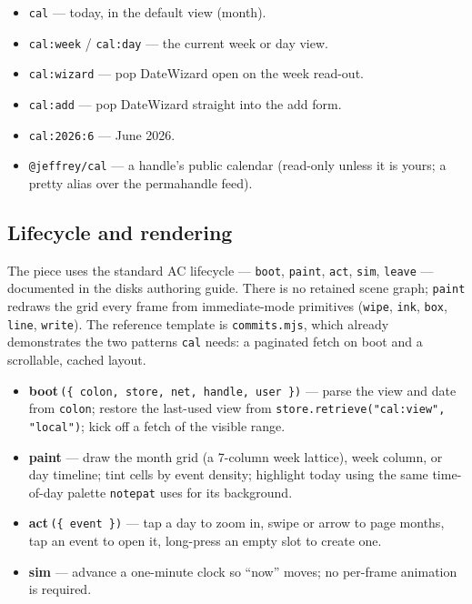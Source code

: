 \documentclass[10pt,letterpaper,twocolumn]{article}
\begin{document}
\begin{itemize}
  \item \texttt{cal} --- today, in the default view (month).
  \item \texttt{cal:week} / \texttt{cal:day} --- the current week or day view.
  \item \texttt{cal:wizard} --- pop DateWizard open on the week read-out.
  \item \texttt{cal:add} --- pop DateWizard straight into the add form.
  \item \texttt{cal:2026:6} --- June 2026.
  \item \texttt{@jeffrey/cal} --- a handle's public calendar (read-only unless it is yours; a pretty alias over the permahandle feed).
\end{itemize}

\subsection{Lifecycle and rendering}

The piece uses the standard AC lifecycle --- \texttt{boot}, \texttt{paint}, \texttt{act}, \texttt{sim}, \texttt{leave} --- documented in the disks authoring guide. There is no retained scene graph; \texttt{paint} redraws the grid every frame from immediate-mode primitives (\texttt{wipe}, \texttt{ink}, \texttt{box}, \texttt{line}, \texttt{write}). The reference template is \texttt{commits.mjs}, which already demonstrates the two patterns \texttt{cal} needs: a paginated fetch on boot and a scrollable, cached layout.

\begin{itemize}
  \item \textbf{boot}\,\texttt{(\{ colon, store, net, handle, user \})} --- parse the view and date from \texttt{colon}; restore the last-used view from \texttt{store.retrieve("cal:view", "local")}; kick off a fetch of the visible range.
  \item \textbf{paint} --- draw the month grid (a 7-column week lattice), week column, or day timeline; tint cells by event density; highlight today using the same time-of-day palette \texttt{notepat} uses for its background.
  \item \textbf{act}\,\texttt{(\{ event \})} --- tap a day to zoom in, swipe or arrow to page months, tap an event to open it, long-press an empty slot to create one.
  \item \textbf{sim} --- advance a one-minute clock so ``now'' moves; no per-frame animation is required.
\end{itemize}
\end{document}
